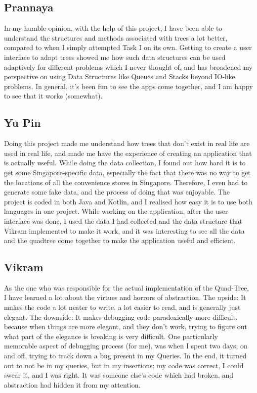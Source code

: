 \documentclass[12pt]{article}
\begin{document}
{\subsection{Prannaya}
In my humble opinion, with the help of this project, I have been able to understand the structures and methods associated with trees a lot better, compared to when I simply attempted Task I on its own. Getting to create a user interface to adapt trees showed me how such data structures can be used adaptively for different problems which I never thought of, and has broadened my perspective on using Data Structures like Queues and Stacks beyond IO-like problems. In general, it's been fun to see the apps come together, and I am happy to see that it works (somewhat).

\subsection{Yu Pin}

Doing this project made me understand how trees that don't exist in real life are used in real life, and made me have the experience of creating an application that is actually useful. While doing the data collection, I found out how hard it is to get some Singapore-specific data, especially the fact that there was no way to get the locations of all the convenience stores in Singapore. Therefore, I even had to generate some fake data, and the process of doing that was enjoyable. The project is coded in both Java and Kotlin, and I realised how easy it is to use both languages in one project. While working on the application, after the user interface was done, I used the data I had collected and the data structure that Vikram implemented to make it work, and it was interesting to see all the data and the quadtree come together to make the application useful and efficient.

\subsection{Vikram}

As the one who was responsible for the actual implementation of the Quad-Tree, I have learned a lot about the virtues and horrors of abstraction. The upside: It makes the code a lot neater to write, a lot easier to read, and is generally just elegant. The downside: It makes debugging code paradoxically more difficult, because when things are more elegant, and they don't work, trying to figure out what part of the elegance is breaking is very difficult. One particularly memorable aspect of debugging process (for me), was when I spent two days, on and off, trying to track down a bug present in my Queries. In the end, it turned out to not be in my queries, but in my insertions; my code was correct, I could swear it, and I was right. It was someone else's code which had broken, and abstraction had hidden it from my attention.

}
\end{document}
